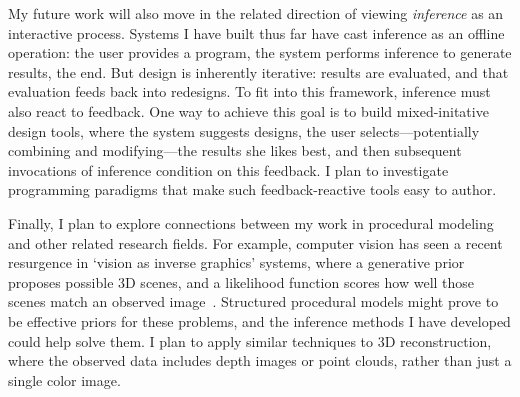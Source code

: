 \documentclass[
10pt, %
a4paper, %
oneside, %
headinclude,footinclude, %
BCOR5mm, %
]{scrartcl}
\begin{document}
My future work will also move in the related direction of viewing \emph{inference} as an interactive process. Systems I have built thus far have cast inference as an offline operation: the user provides a program, the system performs inference to generate results, the end. But design is inherently iterative: results are evaluated, and that evaluation feeds back into redesigns. To fit into this framework, inference must also react to feedback. One way to achieve this goal is to build mixed-initative design tools, where the system suggests designs, the user selects---potentially combining and modifying---the results she likes best, and then subsequent invocations of inference condition on this feedback. I plan to investigate programming paradigms that make such feedback-reactive tools easy to author.

Finally, I plan to explore connections between my work in procedural modeling and other related research fields. For example, computer vision has seen a recent resurgence in `vision as inverse graphics' systems, where a generative prior proposes possible 3D scenes, and a likelihood function scores how well those scenes match an observed image~\cite{Picture}. Structured procedural models might prove to be effective priors for these problems, and the inference methods I have developed could help solve them. I plan to apply similar techniques to 3D reconstruction, where the observed data includes depth images or point clouds, rather than just a single color image.




\end{document}
